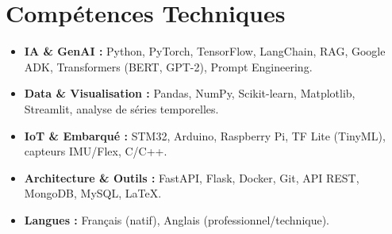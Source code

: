 \documentclass[a4paper,11pt]{article}
\begin{document}
\section{Compétences Techniques}
\begin{itemize}[leftmargin=*, nosep]
    \item \small{\textbf{IA \& GenAI :} Python, PyTorch, TensorFlow, LangChain, RAG, Google ADK, Transformers (BERT, GPT-2), Prompt Engineering.}
    \item \small{\textbf{Data \& Visualisation :} Pandas, NumPy, Scikit-learn, Matplotlib, Streamlit, analyse de séries temporelles.}
    \item \small{\textbf{IoT \& Embarqué :} STM32, Arduino, Raspberry Pi, TF Lite (TinyML), capteurs IMU/Flex, C/C++.}
    \item \small{\textbf{Architecture \& Outils :} FastAPI, Flask, Docker, Git, API REST, MongoDB, MySQL, LaTeX.}
    \item \small{\textbf{Langues :} Français (natif), Anglais (professionnel/technique).}
\end{itemize}

\end{document}
